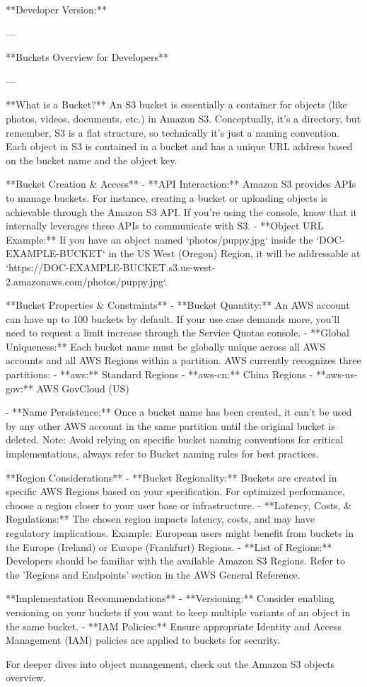 **Developer Version:**

---

**Buckets Overview for Developers**

---

**What is a Bucket?**  
An S3 bucket is essentially a container for objects (like photos, videos, documents, etc.) in Amazon S3. Conceptually, it's a directory, but remember, S3 is a flat structure, so technically it's just a naming convention. Each object in S3 is contained in a bucket and has a unique URL address based on the bucket name and the object key.

**Bucket Creation & Access**  
- **API Interaction:** Amazon S3 provides APIs to manage buckets. For instance, creating a bucket or uploading objects is achievable through the Amazon S3 API. If you're using the console, know that it internally leverages these APIs to communicate with S3.
- **Object URL Example:** If you have an object named `photos/puppy.jpg` inside the `DOC-EXAMPLE-BUCKET` in the US West (Oregon) Region, it will be addressable at `https://DOC-EXAMPLE-BUCKET.s3.us-west-2.amazonaws.com/photos/puppy.jpg`.
  
**Bucket Properties & Constraints**  
- **Bucket Quantity:** An AWS account can have up to 100 buckets by default. If your use case demands more, you'll need to request a limit increase through the Service Quotas console.
- **Global Uniqueness:** Each bucket name must be globally unique across all AWS accounts and all AWS Regions within a partition. AWS currently recognizes three partitions:
    - **aws:** Standard Regions
    - **aws-cn:** China Regions
    - **aws-us-gov:** AWS GovCloud (US)

- **Name Persistence:** Once a bucket name has been created, it can't be used by any other AWS account in the same partition until the original bucket is deleted. Note: Avoid relying on specific bucket naming conventions for critical implementations, always refer to Bucket naming rules for best practices.
  
**Region Considerations**  
- **Bucket Regionality:** Buckets are created in specific AWS Regions based on your specification. For optimized performance, choose a region closer to your user base or infrastructure.
- **Latency, Costs, & Regulations:** The chosen region impacts latency, costs, and may have regulatory implications. Example: European users might benefit from buckets in the Europe (Ireland) or Europe (Frankfurt) Regions.
- **List of Regions:** Developers should be familiar with the available Amazon S3 Regions. Refer to the 'Regions and Endpoints' section in the AWS General Reference.

**Implementation Recommendations**  
- **Versioning:** Consider enabling versioning on your buckets if you want to keep multiple variants of an object in the same bucket.
- **IAM Policies:** Ensure appropriate Identity and Access Management (IAM) policies are applied to buckets for security.

For deeper dives into object management, check out the Amazon S3 objects overview.